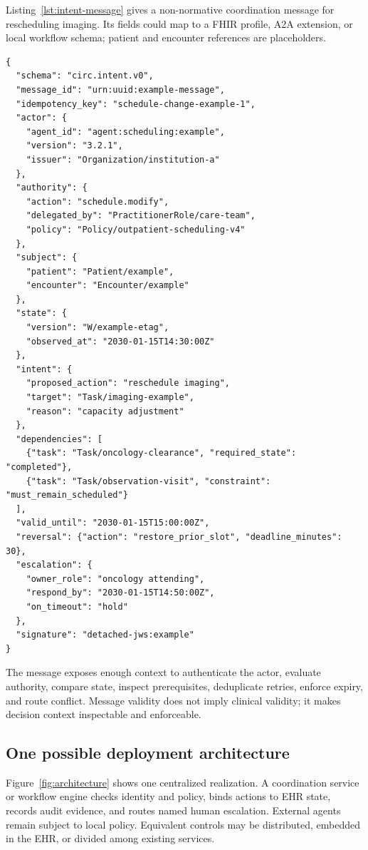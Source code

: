 \documentclass[10pt]{article}
\begin{document}
Listing~\ref{lst:intent-message} gives a non-normative coordination message for rescheduling imaging.
Its fields could map to a FHIR profile, A2A extension, or local workflow schema; patient and encounter
references are placeholders.

\begin{lstlisting}[style=circjson,caption={Illustrative structured coordination message.},label={lst:intent-message}]
{
  "schema": "circ.intent.v0",
  "message_id": "urn:uuid:example-message",
  "idempotency_key": "schedule-change-example-1",
  "actor": {
    "agent_id": "agent:scheduling:example",
    "version": "3.2.1",
    "issuer": "Organization/institution-a"
  },
  "authority": {
    "action": "schedule.modify",
    "delegated_by": "PractitionerRole/care-team",
    "policy": "Policy/outpatient-scheduling-v4"
  },
  "subject": {
    "patient": "Patient/example",
    "encounter": "Encounter/example"
  },
  "state": {
    "version": "W/example-etag",
    "observed_at": "2030-01-15T14:30:00Z"
  },
  "intent": {
    "proposed_action": "reschedule imaging",
    "target": "Task/imaging-example",
    "reason": "capacity adjustment"
  },
  "dependencies": [
    {"task": "Task/oncology-clearance", "required_state": "completed"},
    {"task": "Task/observation-visit", "constraint": "must_remain_scheduled"}
  ],
  "valid_until": "2030-01-15T15:00:00Z",
  "reversal": {"action": "restore_prior_slot", "deadline_minutes": 30},
  "escalation": {
    "owner_role": "oncology attending",
    "respond_by": "2030-01-15T14:50:00Z",
    "on_timeout": "hold"
  },
  "signature": "detached-jws:example"
}
\end{lstlisting}

The message exposes enough context to authenticate the actor, evaluate authority, compare state,
inspect prerequisites, deduplicate retries, enforce expiry, and route conflict. Message validity does
not imply clinical validity; it makes decision context inspectable and enforceable.

\subsection{One possible deployment architecture}

Figure~\ref{fig:architecture} shows one centralized realization. A coordination service or workflow
engine checks identity and policy, binds actions to EHR state, records audit evidence, and routes
named human escalation. External agents remain subject to local policy. Equivalent controls may be
distributed, embedded in the EHR, or divided among existing services.
\end{document}
